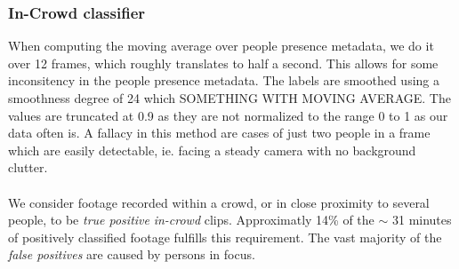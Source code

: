 \subsubsection{In-Crowd classifier}
%
When computing the moving average over people presence metadata, we do it over 12 frames, which roughly translates to half a second. This allows for some inconsitency in the people presence metadata. The labels are smoothed using a smoothness degree of 24 which SOMETHING WITH MOVING AVERAGE. The values are truncated at 0.9 as they are not normalized to the range 0 to 1 as our data often is.
%
A fallacy in this method are cases of just two people in a frame which are easily detectable, ie. facing a steady camera with no background clutter.\\
\\
We consider footage recorded within a crowd, or in close proximity to several people, to be \textit{true positive} \textit{in-crowd} clips. Approximatly 14\% of the $\sim$ 31 minutes of positively classified footage fulfills this requirement. The vast majority of the \textit{false positives} are caused by persons in focus.
%
%
